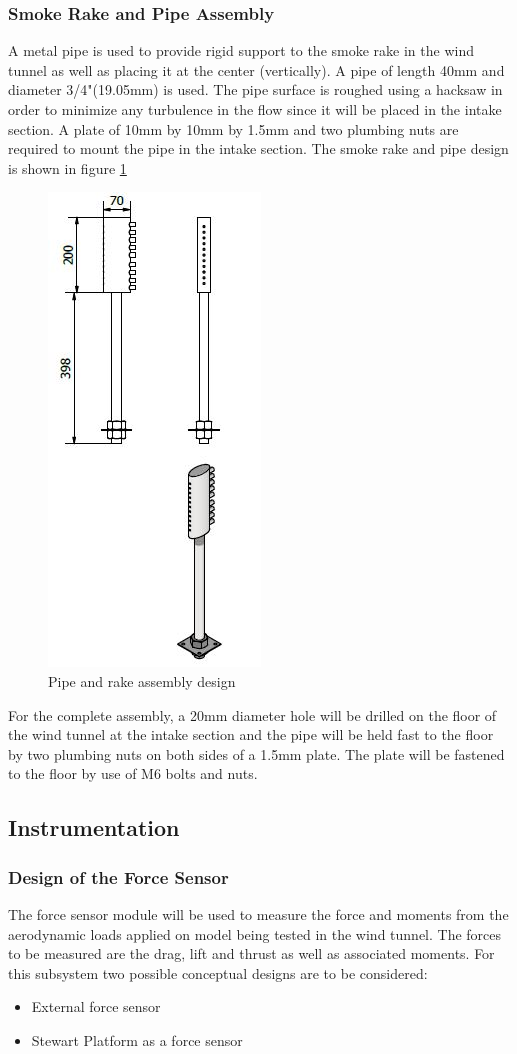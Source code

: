 \subsubsection*{Smoke Rake and Pipe Assembly}
A metal pipe is used to provide rigid support to the smoke rake in the wind tunnel as well as placing it at the center
(vertically). A pipe of length 40mm and diameter 3/4"(19.05mm) is used. The pipe surface is roughed using a hacksaw in
order to minimize any turbulence in the flow since it will be placed in the intake section. A plate of 10mm by 10mm by 1.5mm
and two plumbing nuts are required to mount the pipe in the intake section. The smoke rake and pipe design is shown
in figure \ref{pipe and rake}
\begin{center}
	\begin{figure}[H]
		\centering
		\includegraphics[width=0.25\linewidth]{Figures/pipe and rake.JPG}
		\caption[Pipe and rake]{Pipe and rake assembly design}
		\label{pipe and rake}
	\end{figure}
\end{center}
For the complete assembly, a 20mm diameter hole will be drilled on the floor of the wind tunnel at the intake section
and the pipe will be held fast to the floor by two plumbing nuts on both sides of a 1.5mm plate. The plate will be fastened to
the floor by use of M6 bolts and nuts.
\subsection{Instrumentation}
\subsubsection{Design of the Force Sensor}
The force sensor module will be used to measure the force and moments from the aerodynamic loads applied on model being tested in the wind tunnel. The forces to be measured are the drag, lift and thrust as well as associated moments. For this subsystem two possible conceptual designs are to be considered:
\begin{itemize}
	\item External force sensor
	\item Stewart Platform as a force sensor
\end{itemize}

